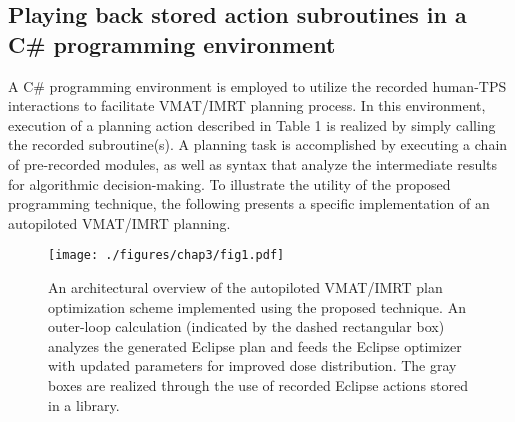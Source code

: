 \subsection{Playing back stored action subroutines in a C\# programming environment}
A C\# programming environment is employed to utilize the recorded human-TPS interactions to facilitate VMAT/IMRT planning process.  In this environment, execution of a planning action described in Table 1 is realized by simply calling the recorded subroutine(s). A planning task is accomplished by executing a chain of pre-recorded modules, as well as syntax that analyze the intermediate results for algorithmic decision-making. To illustrate the utility of the proposed programming technique, the following presents a specific implementation of an autopiloted VMAT/IMRT planning.

\begin{figure}
	\centering
	\texttt{[image: ./figures/chap3/fig1.pdf]}
	\caption{An architectural overview of the autopiloted VMAT/IMRT plan optimization scheme implemented using the proposed technique. An outer-loop calculation (indicated by the dashed rectangular box) analyzes the generated Eclipse plan and feeds the Eclipse optimizer with updated parameters for improved dose distribution. The gray boxes are realized through the use of recorded Eclipse actions stored in a library. 
	\label{fig3.1}}
    \end{figure}
    
